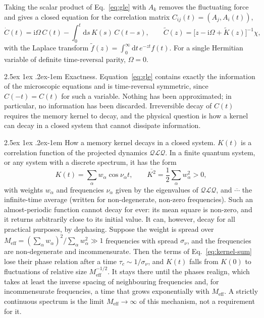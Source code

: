 \documentclass[10pt,a4paper]{article}
\makeatletter
\renewcommand{\paragraph}{\@startsection{paragraph}{4}{\z@}%
  {2.5ex \@plus 1ex \@minus .2ex}{-1em}%
  {\normalfont\fontsize{14pt}{17pt}\selectfont\bfseries}}
\newcommand{\dd}{\mathrm{d}}
\newcommand{\ii}{\mathrm{i}}
\newcommand{\sprod}[2]{\left(#1 , #2\right)}
\newcommand{\LL}{\mathcal{L}}
\newcommand{\QQ}{\mathcal{Q}}
\makeatother
\begin{document}
Taking the scalar product of Eq.~\eqref{eq:gle} with $ A_k $ removes the fluctuating force and gives a closed equation for the correlation matrix $ C_{ij}(t) = \sprod{A_j}{A_i(t)} $,
\begin{equation}
  \dot C(t) = \ii\Omega \, C(t) - \int_0^t \dd s \, K(s) \, C(t-s) ,
  \qquad
  \tilde C(z) = \big[ z - \ii\Omega + \tilde K(z) \big]^{-1} \chi ,
  \label{eq:corr-eq}
\end{equation}
with the Laplace transform $ \tilde f(z) = \int_0^\infty \dd t \, e^{-zt} f(t) $.
For a single Hermitian variable of definite time-reversal parity, $ \Omega = 0 $.

\paragraph{Exactness.}
Equation~\eqref{eq:gle} contains exactly the information of the microscopic equations and is time-reversal symmetric, since $ C(-t) = C(t) $ for such a variable.
Nothing has been approximated; in particular, no information has been discarded.
Irreversible decay of $ C(t) $ requires the memory kernel to decay, and the physical question is how a kernel can decay in a closed system that cannot dissipate information.

\paragraph{How a memory kernel decays in a closed system.}
$ K(t) $ is a correlation function of the projected dynamics $ \QQ\LL\QQ $.
In a finite quantum system, or any system with a discrete spectrum, it has the form
\begin{equation}
  K(t) = \sum_{\alpha} w_\alpha \cos \nu_\alpha t ,
  \qquad
  \overline{K^2} = \frac12 \sum_{\alpha} w_\alpha^2 > 0 ,
  \label{eq:kernel-sum}
\end{equation}
with weights $ w_\alpha $ and frequencies $ \nu_\alpha $ given by the eigenvalues of $ \QQ\LL\QQ $, and $ \overline{\cdots} $ the infinite-time average (written for non-degenerate, non-zero frequencies).
Such an almost-periodic function cannot decay for ever: its mean square is non-zero, and it returns arbitrarily close to its initial value.
It can, however, decay for all practical purposes, by dephasing.
Suppose the weight is spread over $ M_{\mathrm{eff}} = (\sum_\alpha w_\alpha)^2 / \sum_\alpha w_\alpha^2 \gg 1 $ frequencies with spread $ \sigma_\nu $, and the frequencies are non-degenerate and incommensurate.
Then the terms of Eq.~\eqref{eq:kernel-sum} lose their phase relation after a time $ \tau_c \sim 1/\sigma_\nu $, and $ K(t) $ falls from $ K(0) $ to fluctuations of relative size $ M_{\mathrm{eff}}^{-1/2} $.
It stays there until the phases realign, which takes at least the inverse spacing of neighbouring frequencies and, for incommensurate frequencies, a time that grows exponentially with $ M_{\mathrm{eff}} $.
A strictly continuous spectrum is the limit $ M_{\mathrm{eff}} \to \infty $ of this mechanism, not a requirement for it.
\end{document}
